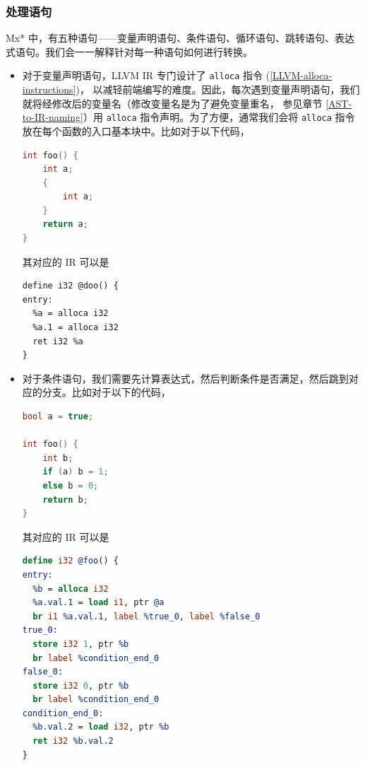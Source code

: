 \subsubsection{处理语句}\label{AST-to-IR-statements}

Mx* 中，有五种语句——变量声明语句、条件语句、循环语句、跳转语句、表达式语句。我们会一一解释针对每一种语句如何进行转换。

\begin{itemize}
\item 对于变量声明语句，LLVM IR 专门设计了 \texttt{alloca} 指令 (\ref{LLVM-alloca-instructions})，
以减轻前端编写的难度。因此，每次遇到变量声明语句，我们就将经修改后的变量名（修改变量名是为了避免变量重名，
参见章节 \ref{AST-to-IR-naming}）用 \texttt{alloca} 指令声明。为了方便，通常我们会将
\texttt{alloca} 指令放在每个函数的入口基本块中。比如对于以下代码，
\begin{lstlisting}[language=C++]
int foo() {
    int a;
    {
        int a;
    }
    return a;
}
\end{lstlisting}
其对应的 IR 可以是
\begin{lstlisting}
define i32 @doo() {
entry:
  %a = alloca i32
  %a.1 = alloca i32
  ret i32 %a
}
\end{lstlisting}

\item 对于条件语句，我们需要先计算表达式，然后判断条件是否满足，然后跳到对应的分支。比如对于以下的代码，
\begin{lstlisting}[language=C++]
bool a = true;

int foo() {
    int b;
    if (a) b = 1;
    else b = 0;
    return b;
}
\end{lstlisting}
其对应的 IR 可以是
\begin{lstlisting}[language=LLVM]
define i32 @foo() {
entry:
  %b = alloca i32
  %a.val.1 = load i1, ptr @a
  br i1 %a.val.1, label %true_0, label %false_0
true_0:
  store i32 1, ptr %b
  br label %condition_end_0
false_0:
  store i32 0, ptr %b
  br label %condition_end_0
condition_end_0:
  %b.val.2 = load i32, ptr %b
  ret i32 %b.val.2
}
\end{lstlisting}


\end{itemize}
